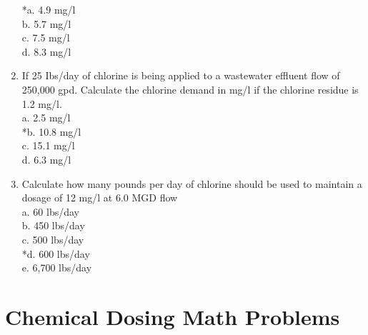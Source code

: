 \begin{enumerate}
*a. 4.9 mg/l \\
b. 5.7 mg/l \\
c. 7.5 mg/l \\
d. 8.3 mg/l \\
\item If 25 Ibs/day of chlorine is being applied to a wastewater effluent flow of 250,000 gpd. Calculate the chlorine demand in mg/l if the chlorine residue is 1.2 mg/l. \\
a. 2.5 mg/l \\
*b. 10.8 mg/l \\
c. 15.1 mg/l \\
d. 6.3 mg/l \\
\item Calculate how many pounds per day of chlorine should be used to maintain a dosage of 12 mg/l at 6.0 MGD flow \\
a. 60 lbs/day \\
b. 450 lbs/day \\
c. 500 lbs/day \\
*d. 600 lbs/day \\
e. 6,700 lbs/day \\
\end{enumerate}

\section*{Chemical Dosing Math Problems}


